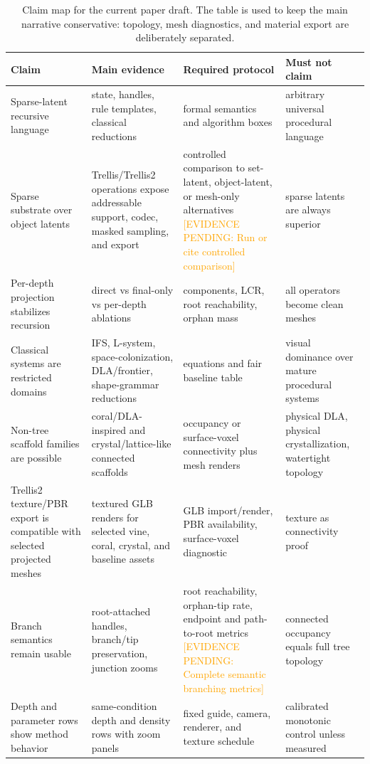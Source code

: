 \documentclass[sigconf,anonymous,review]{acmart}
\providecommand{\EvidencePending}[1]{\textcolor{orange}{[EVIDENCE PENDING: #1]}}
\begin{document}
\begin{table}[t]
  \centering
  \caption{Claim map for the current paper draft. The table is used to keep the main narrative conservative: topology, mesh diagnostics, and material export are deliberately separated.}
  \label{tab:claim-map-current}
  \begin{tabular}{@{}p{}p{}p{}p{}@{}}
    \toprule
    Claim & Main evidence & Required protocol & Must not claim \\
    \midrule
    Sparse-latent recursive language & state, handles, rule templates, classical reductions & formal semantics and algorithm boxes & arbitrary universal procedural language \\
    Sparse substrate over object latents & Trellis/Trellis2 operations expose addressable support, codec, masked sampling, and export & controlled comparison to set-latent, object-latent, or mesh-only alternatives \EvidencePending{Run or cite controlled comparison} & sparse latents are always superior \\
    Per-depth projection stabilizes recursion & direct vs final-only vs per-depth ablations & components, LCR, root reachability, orphan mass & all operators become clean meshes \\
    Classical systems are restricted domains & IFS, L-system, space-colonization, DLA/frontier, shape-grammar reductions & equations and fair baseline table & visual dominance over mature procedural systems \\
    Non-tree scaffold families are possible & coral/DLA-inspired and crystal/lattice-like connected scaffolds & occupancy or surface-voxel connectivity plus mesh renders & physical DLA, physical crystallization, watertight topology \\
    Trellis2 texture/PBR export is compatible with selected projected meshes & textured GLB renders for selected vine, coral, crystal, and baseline assets & GLB import/render, PBR availability, surface-voxel diagnostic & texture as connectivity proof \\
    Branch semantics remain usable & root-attached handles, branch/tip preservation, junction zooms & root reachability, orphan-tip rate, endpoint and path-to-root metrics \EvidencePending{Complete semantic branching metrics} & connected occupancy equals full tree topology \\
    Depth and parameter rows show method behavior & same-condition depth and density rows with zoom panels & fixed guide, camera, renderer, and texture schedule & calibrated monotonic control unless measured \\
    \bottomrule
  \end{tabular}
\end{table}
\end{document}
